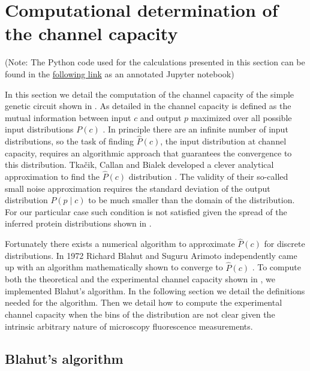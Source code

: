 \section{Computational determination of the channel capacity}
\label{supp_channcap}

(Note: The Python code used for the calculations presented in this section can
be found in the
\href{https://www.rpgroup.caltech.edu//chann_cap/software/blahut_algorithm_channel_capacity.html}{following
link} as an annotated Jupyter notebook)

In this section we detail the computation of the channel capacity of the simple
genetic circuit shown in . As detailed in
 the channel capacity is defined as the mutual information
between input $c$ and output $p$ maximized over all possible input
distributions $P(c)$ \cite{Shannon1948}. In principle there are an infinite
number of input distributions, so the task of finding $\hat{P}(c)$, the input
distribution at channel capacity, requires an algorithmic approach that
guarantees the convergence to this distribution. Tkačik, Callan and Bialek
developed a clever analytical approximation to find the $\hat{P}(c)$
distribution \cite{Tkacik2008a}. The validity of their so-called small noise
approximation requires the standard deviation of the output distribution $P(p
\mid c)$ to be much smaller than the domain of the distribution. For our
particular case such condition is not satisfied given the spread of the
inferred protein distributions shown in .

Fortunately there exists a numerical algorithm to approximate $\hat{P}(c)$ for
discrete distributions. In 1972 Richard Blahut and Suguru Arimoto independently
came up with an algorithm mathematically shown to converge to $\hat{P}(c)$
\cite{Blahut1972}. To compute both the theoretical and the experimental channel
capacity shown in , we implemented Blahut's algorithm. In
the following section we detail the definitions needed for the algorithm. Then
we detail how to compute the experimental channel capacity when the bins of the
distribution are not clear given the intrinsic arbitrary nature of microscopy
fluorescence measurements.

\subsection{Blahut's algorithm}

